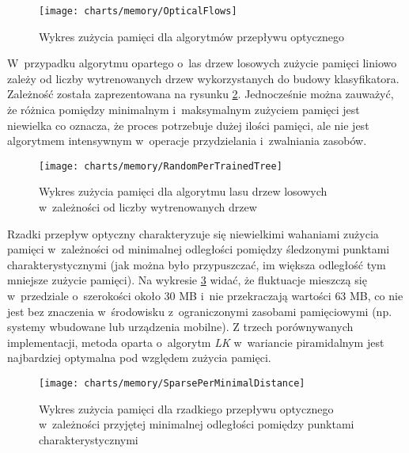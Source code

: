     \begin{figure}[!ht]
      \centering
      \texttt{[image: charts/memory/OpticalFlows]}
      \caption[Wykres zużycia pamięci dla algorytmów przepływu optycznego]
              {Wykres zużycia pamięci dla algorytmów przepływu optycznego}
      \label{fig:OpticalFlowsMemoryUsage}
    \end{figure}

    W~przypadku algorytmu opartego o~las drzew losowych zużycie pamięci liniowo zależy od liczby wytrenowanych drzew wykorzystanych do budowy klasyfikatora. Zależność została zaprezentowana na rysunku \ref{fig:RandomForestTrackerPerTrainedTreesAmount}. Jednocześnie można zauważyć, że różnica pomiędzy minimalnym i~maksymalnym zużyciem pamięci jest niewielka co oznacza, że proces potrzebuje dużej ilości pamięci, ale nie jest algorytmem intensywnym w~operacje przydzielania i~zwalniania zasobów.

    \begin{figure}[!ht]
      \centering
      \texttt{[image: charts/memory/RandomPerTrainedTree]}
      \caption[Wykres zużycia pamięci dla algorytmu lasu drzew losowych w~zależności od liczby wytrenowanych drzew]
              {Wykres zużycia pamięci dla algorytmu lasu drzew losowych w~zależności od liczby wytrenowanych drzew}
      \label{fig:RandomForestTrackerPerTrainedTreesAmount}
    \end{figure}

    Rzadki przepływ optyczny charakteryzuje się niewielkimi wahaniami zużycia pamięci w~zależności od minimalnej odległości pomiędzy śledzonymi punktami charakterystycznymi (jak można było przypuszczać, im większa odległość tym mniejsze zużycie pamięci). Na wykresie \ref{fig:SparseOpticalFlowPerMinimalDistanceBetweenPoints} widać, że fluktuacje mieszczą się w~przedziale o~szerokości około $30$ MB i~nie przekraczają wartości $63$ MB, co nie jest bez znaczenia w~środowisku z~ograniczonymi zasobami pamięciowymi (np. systemy wbudowane lub urządzenia mobilne). Z trzech porównywanych implementacji, metoda oparta o~algorytm \textit{LK} w~wariancie piramidalnym jest najbardziej optymalna pod względem zużycia pamięci.

    \begin{figure}[!ht]
      \centering
      \texttt{[image: charts/memory/SparsePerMinimalDistance]}
      \caption[Wykres zużycia pamięci dla rzadkiego przepływu optycznego w~zależności przyjętej minimalnej odległości pomiędzy punktami charakterystycznymi]
              {Wykres zużycia pamięci dla rzadkiego przepływu optycznego w~zależności przyjętej minimalnej odległości pomiędzy punktami charakterystycznymi}
      \label{fig:SparseOpticalFlowPerMinimalDistanceBetweenPoints}
    \end{figure}

